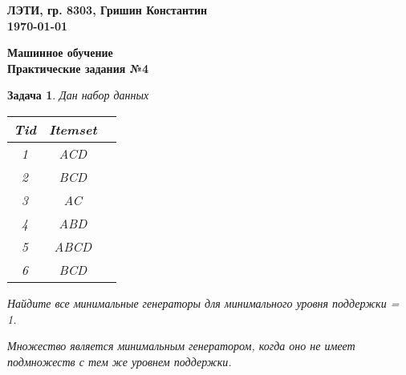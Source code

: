 \documentclass[12pt,a4paper]{article}
\newtheorem{task}[theorem]{Задача}
\begin{document}
\begin{flushright}
\textbf{
  ЛЭТИ, гр. 8303, Гришин Константин \\
  \today
}
\end{flushright}

\begin{center}
\textbf{Машинное обучение} \\
\textbf{Практические задания №4}             \\
\end{center}

\begin{task}
  Дан набор данных

  \begin{center}
    \begin{tabular}{|c|c|c|}
      \hline
      Tid & Itemset \\
      \hline
      1 & ACD \\
      2 & BCD \\
      3 & AC \\
      4 & ABD \\
      5 & ABCD \\
      6 & BCD \\
      \hline
    \end{tabular}
  \end{center}

  Найдите все минимальные генераторы для минимального уровня поддержки = 1.

  Множество является минимальным генератором, когда оно не имеет подмножеств
  с тем же уровнем поддержки.
\end{task}
\end{document}
